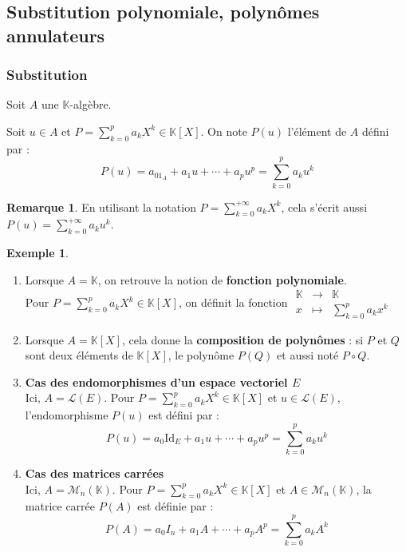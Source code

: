 \documentclass[french]{article}
\newcommand{\K}{\mathbb{K}}
\theoremstyle{plain}
\theoremstyle{definition}
\newtheorem*{ex}{Exemple}
\newtheorem*{rmq}{Remarque}
\theoremstyle{remark}
\begin{document}
\subsection{Substitution polynomiale, polynômes annulateurs}

\subsubsection*{Substitution}

Soit $A$ une $\K$-algèbre.

\begin{dfn}
	Soit $u\in A$ et $P=\displaystyle\sum_{k=0}^{p}a_kX^k\in\K[X]$. On note $P(u)$ l'élément de $A$ défini par : $$P(u)=a_01_A+a_1u+\cdots+a_pu^p=\sum_{k=0}^{p}a_ku^k$$
\end{dfn}

\begin{rmq}
	En utilisant la notation $P=\displaystyle\sum_{k=0}^{+\infty}a_kX^k$, cela s'écrit aussi $P(u)=\displaystyle\sum_{k=0}^{+\infty}a_ku^k$.
\end{rmq}

\begin{ex}
	\begin{enumerate}
		\item Lorsque $A=\K$, on retrouve la notion de \textbf{fonction polynomiale}. \\
		Pour $P=\displaystyle\sum_{k=0}^{p}a_kX^k\in\K[X]$, on définit la fonction $\displaystyle\begin{array}{rcl}
			\K&\longrightarrow&\K\\
			x&\longmapsto&\displaystyle\sum_{k=0}^{p}a_kx^k
		\end{array}$
		\item Lorsque $A=\K[X]$, cela donne la \textbf{composition de polynômes} : si $P$ et $Q$ sont deux éléments de $\K[X]$, le polynôme $P(Q)$ et aussi noté $P\circ Q$.
		\item \textbf{Cas des endomorphismes d'un espace vectoriel $E$} \\
		Ici, $A=\mathcal{L}(E)$. Pour $P=\displaystyle\sum_{k=0}^{p}a_kX^k\in\K[X]$ et $u\in\mathcal{L}(E)$, l'endomorphisme $P(u)$ est défini par : $$P(u)=a_0\text{Id}_E+a_1u+\cdots+a_pu^p=\sum_{k=0}^{p}a_ku^k$$
		\item \textbf{Cas des matrices carrées} \\
		Ici, $A=\mathcal{M}_n(\K)$. Pour $P=\displaystyle\sum_{k=0}^{p}a_kX^k\in\K[X]$ et $A\in\mathcal{M}_n(\K)$, la matrice carrée $P(A)$ est définie par : $$P(A)=a_0I_n+a_1A+\cdots+a_pA^p=\sum_{k=0}^{p}a_kA^k$$
	\end{enumerate}
\end{ex}
\end{document}

